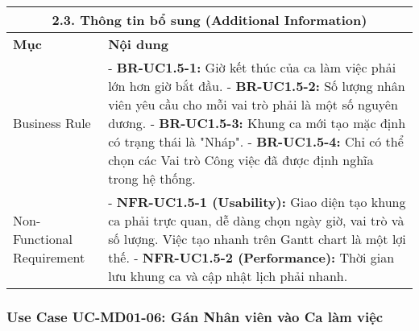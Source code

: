 \begin{longtable}{|m{4cm}|p{11cm}|}
\hline
\multicolumn{2}{|c|}{\textbf{2.3. Thông tin bổ sung (Additional Information)}} \\
\hline
\textbf{Mục} & \textbf{Nội dung} \\
\hline
Business Rule & - \textbf{BR-UC1.5-1:} Giờ kết thúc của ca làm việc phải lớn hơn giờ bắt đầu. \newline - \textbf{BR-UC1.5-2:} Số lượng nhân viên yêu cầu cho mỗi vai trò phải là một số nguyên dương. \newline - \textbf{BR-UC1.5-3:} Khung ca mới tạo mặc định có trạng thái là "Nháp". \newline - \textbf{BR-UC1.5-4:} Chỉ có thể chọn các Vai trò Công việc đã được định nghĩa trong hệ thống. \\
\hline
Non-Functional Requirement & - \textbf{NFR-UC1.5-1 (Usability):} Giao diện tạo khung ca phải trực quan, dễ dàng chọn ngày giờ, vai trò và số lượng. Việc tạo nhanh trên Gantt chart là một lợi thế. \newline - \textbf{NFR-UC1.5-2 (Performance):} Thời gian lưu khung ca và cập nhật lịch phải nhanh. \\
\hline
\end{longtable}

\subsubsection{Use Case UC-MD01-06: Gán Nhân viên vào Ca làm việc}

